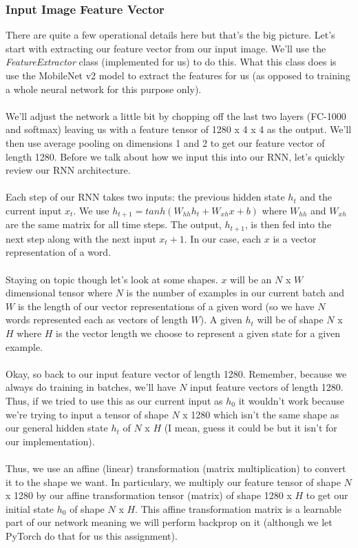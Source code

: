 \documentclass[12pt]{article}
\begin{document}
\subsubsection{Input Image Feature Vector}
There are quite a few operational details here but that's the big picture. Let's start with extracting 
our feature vector from our input image. We'll use the \emph{FeatureExtractor} class
(implemented for us) to do this. What this class does is use the MobileNet v2 model 
to extract the features for us (as opposed to training a whole neural network for this 
purpose only). 
~\\
~\\
We'll adjust the network a little bit by chopping off the last two layers 
(FC-1000 and softmax) leaving us with a feature tensor of 1280 x 4 x 4 as the output. We'll then use 
average pooling on dimensions 1 and 2 to get our feature vector of length 1280. Before we 
talk about how we input this into our RNN, let's quickly review our RNN architecture. 
~\\
~\\
Each step of our RNN takes two inputs: the previous hidden state $h_t$ and the current 
input $x_t$. We use $h_{t+1} = tanh(W_{hh}h_{t} + W_{xh}x + b)$ where $W_{hh}$ and $W_{xh}$ 
are the same matrix for all time steps. The output, $h_{t+1}$, is then fed into the next 
step along with the next input $x_t+1$. In our case, each $x$ is a vector representation of 
a word. 
~\\
~\\
Staying on topic though let's look at some shapes. $x$ will be an $N$ x $W$ dimensional tensor 
where $N$ is the number of examples in our current batch and $W$ is the length of our vector 
representations of a given word (so we have $N$ words represented each as vectors of length $W$). 
A given $h_t$ will be of shape $N$ x $H$ where $H$ is the vector length we choose to represent 
a given state for a given example. 
~\\
~\\
Okay, so back to our input feature vector of length 1280. Remember, because we always do training 
in batches, we'll have $N$ input feature vectors of length 1280. Thus, if we tried to use 
this as our current input as $h_0$ it wouldn't work because we're trying to input a tensor of 
shape $N$ x 1280 which isn't the same shape as our general hidden state $h_t$ of $N$ x $H$ (I mean, guess it could be 
but it isn't for our implementation). 
~\\
~\\
Thus, we use an affine (linear) transformation (matrix 
multiplication) to convert it to the shape we want. In particulary, we multiply our feature 
tensor of shape $N$ x 1280 by our affine transformation tensor (matrix) of shape 1280 x $H$ 
to get our initial state $h_0$ of shape $N$ x $H$. This affine transformation matrix is a 
learnable part of our network meaning we will perform backprop on it (although we let PyTorch 
do that for us this assignment). 
\end{document}
